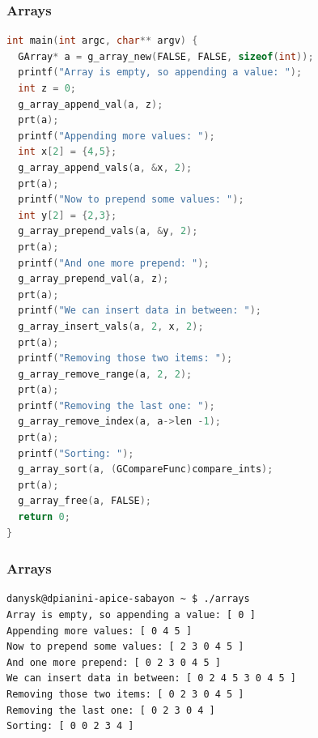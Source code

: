 \documentclass{beamer}
\begin{document}
\begin{frame}[fragile]
\frametitle{Arrays}
\begin{lstlisting}[language=C]
int main(int argc, char** argv) {
  GArray* a = g_array_new(FALSE, FALSE, sizeof(int));
  printf("Array is empty, so appending a value: ");
  int z = 0;
  g_array_append_val(a, z);
  prt(a);
  printf("Appending more values: ");
  int x[2] = {4,5};
  g_array_append_vals(a, &x, 2);
  prt(a);
  printf("Now to prepend some values: ");
  int y[2] = {2,3};
  g_array_prepend_vals(a, &y, 2);
  prt(a);
  printf("And one more prepend: ");
  g_array_prepend_val(a, z);
  prt(a);
  printf("We can insert data in between: ");
  g_array_insert_vals(a, 2, x, 2);
  prt(a);
  printf("Removing those two items: ");
  g_array_remove_range(a, 2, 2);
  prt(a);
  printf("Removing the last one: ");
  g_array_remove_index(a, a->len -1);
  prt(a);
  printf("Sorting: ");
  g_array_sort(a, (GCompareFunc)compare_ints);
  prt(a);
  g_array_free(a, FALSE);
  return 0;
}
\end{lstlisting}
\end{frame}

\begin{frame}[fragile]
\frametitle{Arrays}
\begin{verbatim}
danysk@dpianini-apice-sabayon ~ $ ./arrays 
Array is empty, so appending a value: [ 0 ]
Appending more values: [ 0 4 5 ]
Now to prepend some values: [ 2 3 0 4 5 ]
And one more prepend: [ 0 2 3 0 4 5 ]
We can insert data in between: [ 0 2 4 5 3 0 4 5 ]
Removing those two items: [ 0 2 3 0 4 5 ]
Removing the last one: [ 0 2 3 0 4 ]
Sorting: [ 0 0 2 3 4 ]
\end{verbatim}
\end{frame}

\newcommand{\pkgconfig}{\texttt{pkg\_config}}
\end{document}
